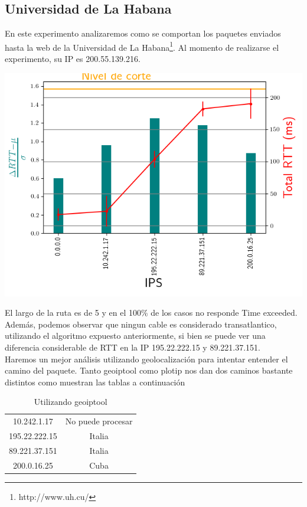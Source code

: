\subsection{Universidad de La Habana}

En este experimento analizaremos como se comportan los paquetes enviados hasta la web de la Universidad de La Habana\footnote{http://www.uh.cu/}. Al momento de realizarse el experimento, su IP es 200.55.139.216.

 \includegraphics[scale=0.8]{imagenes/rtts_habana.png}

El largo de la ruta es de 5 y en el 100\% de los casos no responde Time exceeded. Adem\'as, podemos observar que ningun cable es considerado transatlantico, utilizando el algoritmo expuesto anteriormente, si bien se puede ver una diferencia considerable de RTT en la IP 195.22.222.15 y 89.221.37.151.  \\

Haremos un mejor an\'alisis utilizando geolocalizaci\'on para intentar entender el camino del paquete. Tanto geoiptool como plotip nos dan dos caminos bastante distintos como muestran las tablas a continuaci\'on
 
\begin{table}
\centering
\begin{tabular}{|c|c|}
10.242.1.17 & No puede procesar \\
195.22.222.15 & Italia  \\
89.221.37.151 & Italia \\
200.0.16.25 & Cuba \\
\end{tabular}
\caption{Utilizando geoiptool}
\end{table}

